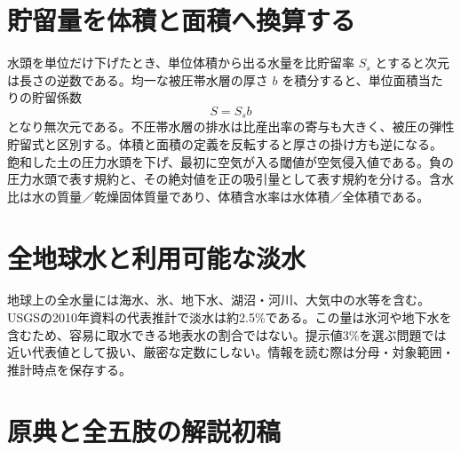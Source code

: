 \section{貯留量を体積と面積へ換算する}\label{theory:hydro:storage}
水頭を単位だけ下げたとき、単位体積から出る水量を比貯留率 \(S_s\) とすると次元は長さの逆数である。均一な被圧帯水層の厚さ \(b\) を積分すると、単位面積当たりの貯留係数
\[
 S=S_sb
\]
となり無次元である\cite{analysis49_storage_ref}。不圧帯水層の排水は比産出率の寄与も大きく、被圧の弾性貯留式と区別する。体積と面積の定義を反転すると厚さの掛け方も逆になる。
飽和した土の圧力水頭を下げ、最初に空気が入る閾値が空気侵入値である。負の圧力水頭で表す規約と、その絶対値を正の吸引量として表す規約を分ける。含水比は水の質量／乾燥固体質量であり、体積含水率は水体積／全体積である。

\section{全地球水と利用可能な淡水}\label{theory:hydro:global}
地球上の全水量には海水、氷、地下水、湖沼・河川、大気中の水等を含む。USGSの2010年資料の代表推計で淡水は約2.5\%である\cite{analysis49_fresh_ref}。この量は氷河や地下水を含むため、容易に取水できる地表水の割合ではない。提示値3\%を選ぶ問題では近い代表値として扱い、厳密な定数にしない。情報を読む際は分母・対象範囲・推計時点を保存する。

\section{原典と全五肢の解説初稿}

